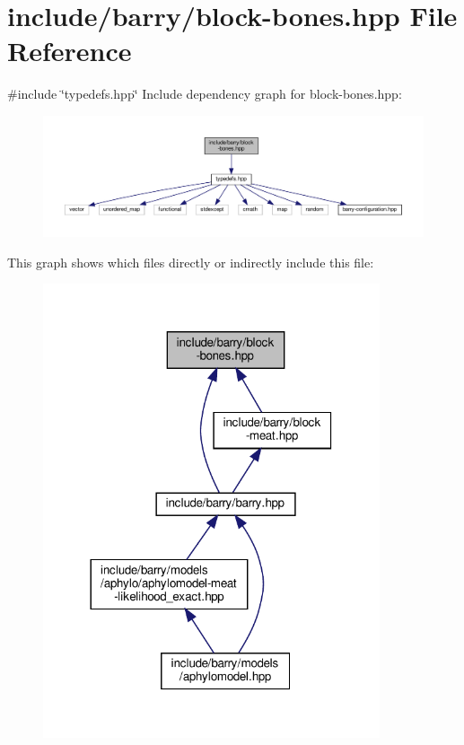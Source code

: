 \hypertarget{block-bones_8hpp}{}\section{include/barry/block-\/bones.hpp File Reference}
\label{block-bones_8hpp}
{\ttfamily \#include \char`\"{}typedefs.\+hpp\char`\"{}}\newline
Include dependency graph for block-\/bones.hpp\+:\nopagebreak
\begin{figure}[H]
\begin{center}
\leavevmode
\includegraphics[width=350pt]{block-bones_8hpp__incl}
\end{center}
\end{figure}
This graph shows which files directly or indirectly include this file\+:
\nopagebreak
\begin{figure}[H]
\begin{center}
\leavevmode
\includegraphics[width=281pt]{block-bones_8hpp__dep__incl}
\end{center}
\end{figure}
